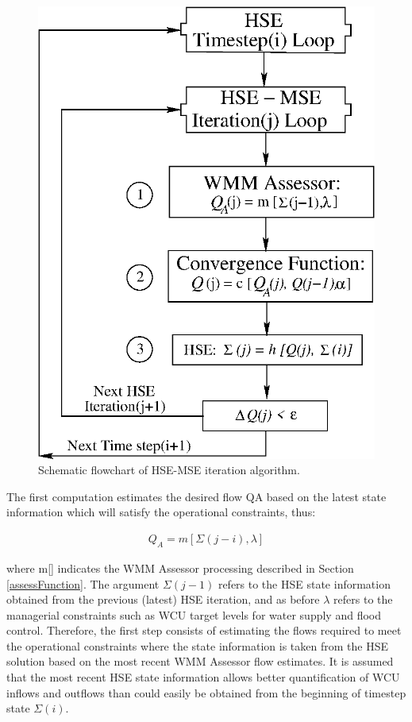 \begin{figure}
 \begin{center}
  \includegraphics[scale=.33]{Graphics/flowchartIteration.eps}
 \end{center}
 \caption{\label{fig:flowchartIteration} Schematic flowchart of
   HSE-MSE iteration algorithm.}
\end{figure}

The first computation estimates the desired flow QA based on the
latest state information which will satisfy the operational
constraints, thus:

\begin{align}
  Q_A = m [ \Sigma (j - i), \lambda ]
\end{align}

where m[] indicates the WMM Assessor processing described in Section
\ref{assessFunction}. The argument $\Sigma(j-1)$ refers to the HSE
state information obtained from the previous (latest) HSE iteration,
and as before $\lambda$ refers to the managerial constraints such as
WCU target levels for water supply and flood control. Therefore, the
first step consists of estimating the flows required to meet the
operational constraints where the state information is taken from the
HSE solution based on the most recent WMM Assessor flow estimates. It
is assumed that the most recent HSE state information allows better
quantification of WCU inflows and outflows than could easily be
obtained from the beginning of timestep state $\Sigma (i)$.

